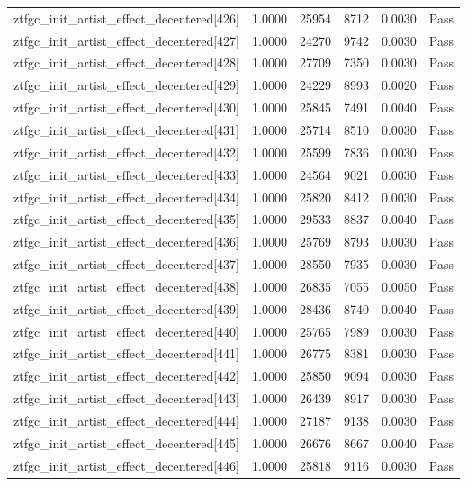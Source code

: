 \begin{table}[htbp]
\begin{tabular}{llrrll}
ztfgc\_init\_artist\_effect\_decentered[426] & 1.0000 & 25954 & 8712 & 0.0030 & Pass \\
ztfgc\_init\_artist\_effect\_decentered[427] & 1.0000 & 24270 & 9742 & 0.0030 & Pass \\
ztfgc\_init\_artist\_effect\_decentered[428] & 1.0000 & 27709 & 7350 & 0.0030 & Pass \\
ztfgc\_init\_artist\_effect\_decentered[429] & 1.0000 & 24229 & 8993 & 0.0020 & Pass \\
ztfgc\_init\_artist\_effect\_decentered[430] & 1.0000 & 25845 & 7491 & 0.0040 & Pass \\
ztfgc\_init\_artist\_effect\_decentered[431] & 1.0000 & 25714 & 8510 & 0.0030 & Pass \\
ztfgc\_init\_artist\_effect\_decentered[432] & 1.0000 & 25599 & 7836 & 0.0030 & Pass \\
ztfgc\_init\_artist\_effect\_decentered[433] & 1.0000 & 24564 & 9021 & 0.0030 & Pass \\
ztfgc\_init\_artist\_effect\_decentered[434] & 1.0000 & 25820 & 8412 & 0.0030 & Pass \\
ztfgc\_init\_artist\_effect\_decentered[435] & 1.0000 & 29533 & 8837 & 0.0040 & Pass \\
ztfgc\_init\_artist\_effect\_decentered[436] & 1.0000 & 25769 & 8793 & 0.0030 & Pass \\
ztfgc\_init\_artist\_effect\_decentered[437] & 1.0000 & 28550 & 7935 & 0.0030 & Pass \\
ztfgc\_init\_artist\_effect\_decentered[438] & 1.0000 & 26835 & 7055 & 0.0050 & Pass \\
ztfgc\_init\_artist\_effect\_decentered[439] & 1.0000 & 28436 & 8740 & 0.0040 & Pass \\
ztfgc\_init\_artist\_effect\_decentered[440] & 1.0000 & 25765 & 7989 & 0.0030 & Pass \\
ztfgc\_init\_artist\_effect\_decentered[441] & 1.0000 & 26775 & 8381 & 0.0030 & Pass \\
ztfgc\_init\_artist\_effect\_decentered[442] & 1.0000 & 25850 & 9094 & 0.0030 & Pass \\
ztfgc\_init\_artist\_effect\_decentered[443] & 1.0000 & 26439 & 8917 & 0.0030 & Pass \\
ztfgc\_init\_artist\_effect\_decentered[444] & 1.0000 & 27187 & 9138 & 0.0030 & Pass \\
ztfgc\_init\_artist\_effect\_decentered[445] & 1.0000 & 26676 & 8667 & 0.0040 & Pass \\
ztfgc\_init\_artist\_effect\_decentered[446] & 1.0000 & 25818 & 9116 & 0.0030 & Pass \\

\end{tabular}
\end{table}
